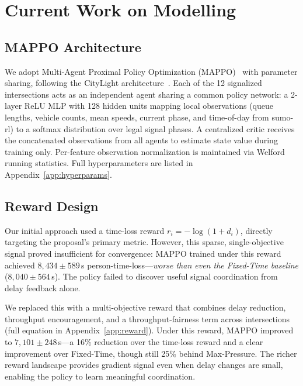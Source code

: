 
\section{Current Work on Modelling}

\subsection{MAPPO Architecture}

We adopt Multi-Agent Proximal Policy Optimization (MAPPO)~\cite{mappo} with
parameter sharing, following the CityLight architecture~\cite{citylight}.
Each of the 12 signalized intersections acts as an independent agent sharing a
common policy network: a 2-layer ReLU MLP with 128 hidden units mapping local
observations (queue lengths, vehicle counts, mean speeds, current phase, and
time-of-day from sumo-rl) to a softmax distribution over legal signal phases.
A centralized critic receives the concatenated observations from all agents
to estimate state value during training only. Per-feature observation
normalization is maintained via Welford running statistics. Full
hyperparameters are listed in Appendix~\ref{app:hyperparams}.

\subsection{Reward Design}

Our initial approach used a time-loss reward $r_i = -\log(1 + d_i)$, directly
targeting the proposal's primary metric. However, this sparse,
single-objective signal proved insufficient for convergence: MAPPO trained
under this reward achieved $8{,}434 \pm 589$\,s person-time-loss---\emph{worse
than even the Fixed-Time baseline} ($8{,}040 \pm 564$\,s). The policy failed
to discover useful signal coordination from delay feedback alone.

We replaced this with a multi-objective reward that combines delay reduction,
throughput encouragement, and a throughput-fairness term across intersections
(full equation in Appendix~\ref{app:reward}). Under this reward, MAPPO
improved to $7{,}101 \pm 248$\,s---a 16\% reduction over the time-loss reward
and a clear improvement over Fixed-Time, though still 25\% behind
Max-Pressure. The richer reward landscape provides gradient signal even when
delay changes are small, enabling the policy to learn meaningful coordination.

